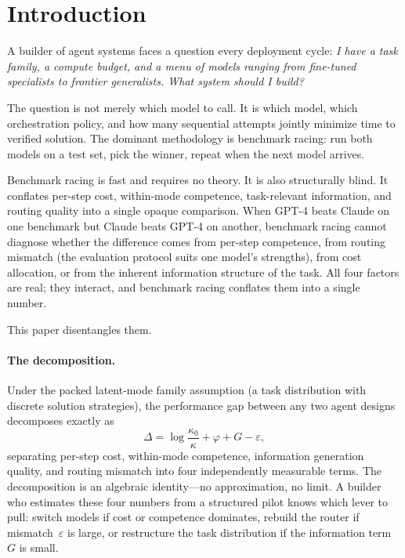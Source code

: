 \section{Introduction}
\label{sec:intro}

A builder of agent systems faces a question every deployment cycle: \emph{I have a task family, a compute budget, and a menu of models ranging from fine-tuned specialists to frontier generalists.
What system should I build?}

The question is not merely which model to call.
It is which model, which orchestration policy, and how many sequential attempts jointly minimize time to verified solution.
The dominant methodology is benchmark racing: run both models on a test set, pick the winner, repeat when the next model arrives.

Benchmark racing is fast and requires no theory.
It is also structurally blind.
It conflates per-step cost, within-mode competence, task-relevant information, and routing quality into a single opaque comparison.
When GPT-4 beats Claude on one benchmark but Claude beats GPT-4 on another, benchmark racing cannot diagnose whether the difference comes from per-step competence, from routing mismatch (the evaluation protocol suits one model's strengths), from cost allocation, or from the inherent information structure of the task.
All four factors are real; they interact, and benchmark racing conflates them into a single number.

This paper disentangles them.

\paragraph{The decomposition.}
Under the packed latent-mode family assumption (a task distribution with discrete solution strategies), the performance gap between any two agent designs decomposes exactly as
\begin{equation}
\label{eq:four-term-intro}
\Delta = \log\frac{\kappa_0}{\kappa} + \varphi + G - \varepsilon,
\end{equation}
separating per-step cost, within-mode competence, information generation quality, and routing mismatch into four independently measurable terms.
The decomposition is an algebraic identity---no approximation, no limit.
A builder who estimates these four numbers from a structured pilot knows which lever to pull: switch models if cost or competence dominates, rebuild the router if mismatch~$\varepsilon$ is large, or restructure the task distribution if the information term~$G$ is small.

